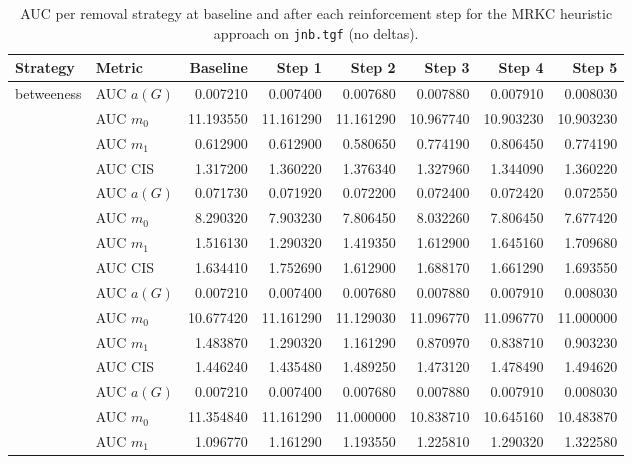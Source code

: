 \begin{table}[htbp]
  \centering
  \caption{AUC per removal strategy at baseline and after each reinforcement step for the MRKC heuristic approach on \texttt{jnb.tgf} (no deltas).}
  \label{tab:jnb-mrkc_heuristic-auc}
  \begin{tabular}{llrrrrrr}
    \toprule
    \textbf{Strategy} & \textbf{Metric} & \textbf{Baseline} & \textbf{Step 1} & \textbf{Step 2} & \textbf{Step 3} & \textbf{Step 4} & \textbf{Step 5} \\
    \midrule
    \multirow{4}{*}{betweeness} & AUC $a(G)$ & 0.007210 & 0.007400 & 0.007680 & 0.007880 & 0.007910 & 0.008030 \\
    & AUC $m_0$ & 11.193550 & 11.161290 & 11.161290 & 10.967740 & 10.903230 & 10.903230 \\
    & AUC $m_1$ & 0.612900 & 0.612900 & 0.580650 & 0.774190 & 0.806450 & 0.774190 \\
    & AUC CIS & 1.317200 & 1.360220 & 1.376340 & 1.327960 & 1.344090 & 1.360220 \\
    \addlinespace
    \multirow{4}{*}{closeness} & AUC $a(G)$ & 0.071730 & 0.071920 & 0.072200 & 0.072400 & 0.072420 & 0.072550 \\
    & AUC $m_0$ & 8.290320 & 7.903230 & 7.806450 & 8.032260 & 7.806450 & 7.677420 \\
    & AUC $m_1$ & 1.516130 & 1.290320 & 1.419350 & 1.612900 & 1.645160 & 1.709680 \\
    & AUC CIS & 1.634410 & 1.752690 & 1.612900 & 1.688170 & 1.661290 & 1.693550 \\
    \addlinespace
    \multirow{4}{*}{core influence} & AUC $a(G)$ & 0.007210 & 0.007400 & 0.007680 & 0.007880 & 0.007910 & 0.008030 \\
    & AUC $m_0$ & 10.677420 & 11.161290 & 11.129030 & 11.096770 & 11.096770 & 11.000000 \\
    & AUC $m_1$ & 1.483870 & 1.290320 & 1.161290 & 0.870970 & 0.838710 & 0.903230 \\
    & AUC CIS & 1.446240 & 1.435480 & 1.489250 & 1.473120 & 1.478490 & 1.494620 \\
    \addlinespace
    \multirow{4}{*}{degree} & AUC $a(G)$ & 0.007210 & 0.007400 & 0.007680 & 0.007880 & 0.007910 & 0.008030 \\
    & AUC $m_0$ & 11.354840 & 11.161290 & 11.000000 & 10.838710 & 10.645160 & 10.483870 \\
    & AUC $m_1$ & 1.096770 & 1.161290 & 1.193550 & 1.225810 & 1.290320 & 1.322580 \\

\end{tabular}
\end{table}
